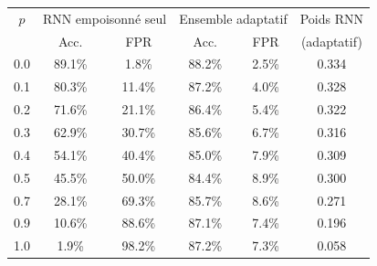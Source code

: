 \begin{tabular}{cccccc}
\toprule
$p$ & \multicolumn{2}{c}{RNN empoisonné seul} & \multicolumn{2}{c}{Ensemble adaptatif} & Poids RNN \\
 & Acc. & FPR & Acc. & FPR & (adaptatif) \\
\midrule
0.0 & 89.1\% & 1.8\% & 88.2\% & 2.5\% & 0.334 \\
0.1 & 80.3\% & 11.4\% & 87.2\% & 4.0\% & 0.328 \\
0.2 & 71.6\% & 21.1\% & 86.4\% & 5.4\% & 0.322 \\
0.3 & 62.9\% & 30.7\% & 85.6\% & 6.7\% & 0.316 \\
0.4 & 54.1\% & 40.4\% & 85.0\% & 7.9\% & 0.309 \\
0.5 & 45.5\% & 50.0\% & 84.4\% & 8.9\% & 0.300 \\
0.7 & 28.1\% & 69.3\% & 85.7\% & 8.6\% & 0.271 \\
0.9 & 10.6\% & 88.6\% & 87.1\% & 7.4\% & 0.196 \\
1.0 & 1.9\% & 98.2\% & 87.2\% & 7.3\% & 0.058 \\
\bottomrule
\end{tabular}